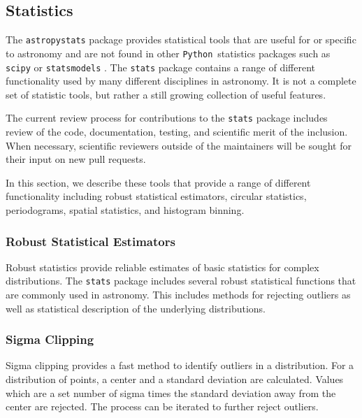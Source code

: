 \documentclass[modern]{aastex61}
\newcommand{\package}[1]{\texttt{#1}\xspace}
\newcommand{\python}{\package{Python}\xspace}
\newcommand{\astropypkg}{\package{astropy}\xspace}
\begin{document}
\subsection{Statistics}

The \astropypkg \package{stats} package provides
statistical tools that are useful for or specific to
astronomy and are not found in other \python\
statistics packages such as \package{scipy}
\citep{scipy} or \package{statsmodels}
\citep{seabold2010statsmodels}.   The
\package{stats} package contains a range of
different functionality used by many different
disciplines in astronomy.   It is not a complete set
of statistic tools, but rather a still growing
collection of useful features.

The current review process for contributions to the \package{stats} package includes review of the code, documentation, testing, and scientific merit of the inclusion.  When necessary, scientific reviewers outside of the maintainers will be sought for their input on new pull requests.

In this section, we describe these tools that provide a range of different functionality including robust statistical estimators, circular statistics, periodograms, spatial statistics, and histogram binning.




\subsubsection{Robust Statistical Estimators}

Robust statistics provide reliable estimates of basic statistics for complex distributions. The \package{stats} package includes several robust statistical functions that are commonly used in astronomy. This includes methods for rejecting outliers as well as statistical description of the underlying distributions.

\subsubsection{Sigma Clipping}

Sigma clipping provides a fast method to identify outliers in a distribution. For a distribution of points, a center and a standard deviation are calculated. Values which are a set number of sigma times the standard deviation away from the center are rejected. The process can be iterated to further reject outliers.
\end{document}
